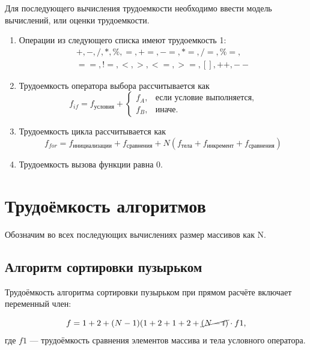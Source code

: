 Для последующего вычисления трудоемкости необходимо ввести модель вычислений, или оценки трудоемкости.
\begin{enumerate}
	\item Операции из следующего списка имеют трудоемкость 1:
	\begin{equation}
		\label{for:opers}
		\begin{array}{cc}
		+, -, /, *, \%, =, +=, -=, *=, /=, \%=,\\
		==, !=, <, >, <=, >=, [], ++, {-}-
		\end{array}
	\end{equation}
	\item Трудоемкость оператора выбора  рассчитывается как
	\begin{equation}
		\label{for:if}
		f_{if} = f_{\text{условия}} +
		\begin{cases}
			f_A, & \text{если условие выполняется,}\\
			f_B, & \text{иначе.}
		\end{cases}
	\end{equation}
	\item Трудоемкость цикла рассчитывается как
	\begin{equation}
		\label{for:for}
		f_{for} = f_{\text{инициализации}} + f_{\text{сравнения}} + N(f_{\text{тела}} + f_{\text{инкремент}} + f_{\text{сравнения}})
	\end{equation}
	\item Трудоемкость вызова функции равна 0.
\end{enumerate}

\section{Трудоёмкость алгоритмов}

Обозначим во всех последующих вычислениях размер массивов как N.
\newpage
\subsection{Алгоритм сортировки пузырьком}


Трудоёмкость алгоритма сортировки пузырьком при прямом расчёте включает переменный член:

\begin{equation}
	f = 1 + 2 + (N - 1)(1 + 2 + 1 + 2 + \cancel{(N - i)}\cdot f{1},
\end{equation}
где $f{1}$ --- трудоёмкость сравнения элементов массива и тела условного оператора.

